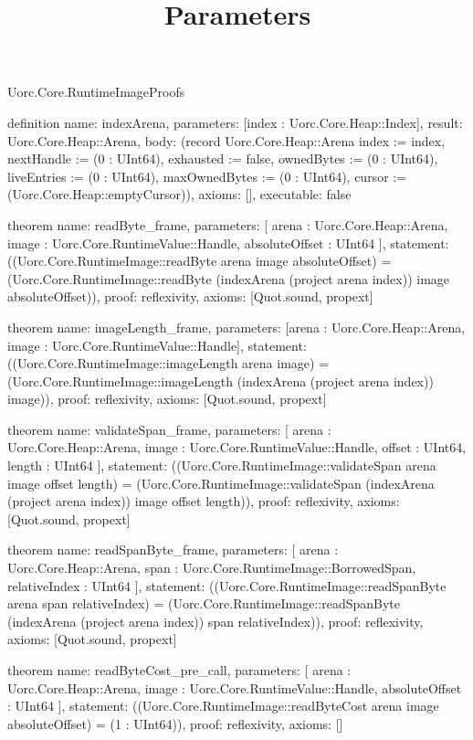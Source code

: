 \begin{lexlean}{Uorc.Core.RuntimeImageProofs}




\title{Parameters}

\begin{semanticmodule}
definition{
  name: indexArena,
  parameters: [index : Uorc.Core.Heap::Index],
  result: Uorc.Core.Heap::Arena,
  body: (record Uorc.Core.Heap::Arena {index := index, nextHandle := (0 : UInt64), exhausted := false, ownedBytes := (0 : UInt64), liveEntries := (0 : UInt64), maxOwnedBytes := (0 : UInt64), cursor := (Uorc.Core.Heap::emptyCursor)}),
  axioms: [],
  executable: false
}

theorem{
  name: readByte_frame,
  parameters: [
    arena : Uorc.Core.Heap::Arena,
    image : Uorc.Core.RuntimeValue::Handle,
    absoluteOffset : UInt64
  ],
  statement: ((Uorc.Core.RuntimeImage::readByte arena image absoluteOffset) = (Uorc.Core.RuntimeImage::readByte (indexArena (project arena index)) image absoluteOffset)),
  proof: reflexivity{},
  axioms: [Quot.sound, propext]
}

theorem{
  name: imageLength_frame,
  parameters: [arena : Uorc.Core.Heap::Arena, image : Uorc.Core.RuntimeValue::Handle],
  statement: ((Uorc.Core.RuntimeImage::imageLength arena image) = (Uorc.Core.RuntimeImage::imageLength (indexArena (project arena index)) image)),
  proof: reflexivity{},
  axioms: [Quot.sound, propext]
}

theorem{
  name: validateSpan_frame,
  parameters: [
    arena : Uorc.Core.Heap::Arena,
    image : Uorc.Core.RuntimeValue::Handle,
    offset : UInt64,
    length : UInt64
  ],
  statement: ((Uorc.Core.RuntimeImage::validateSpan arena image offset length) = (Uorc.Core.RuntimeImage::validateSpan (indexArena (project arena index)) image offset length)),
  proof: reflexivity{},
  axioms: [Quot.sound, propext]
}

theorem{
  name: readSpanByte_frame,
  parameters: [
    arena : Uorc.Core.Heap::Arena,
    span : Uorc.Core.RuntimeImage::BorrowedSpan,
    relativeIndex : UInt64
  ],
  statement: ((Uorc.Core.RuntimeImage::readSpanByte arena span relativeIndex) = (Uorc.Core.RuntimeImage::readSpanByte (indexArena (project arena index)) span relativeIndex)),
  proof: reflexivity{},
  axioms: [Quot.sound, propext]
}

theorem{
  name: readByteCost_pre_call,
  parameters: [
    arena : Uorc.Core.Heap::Arena,
    image : Uorc.Core.RuntimeValue::Handle,
    absoluteOffset : UInt64
  ],
  statement: ((Uorc.Core.RuntimeImage::readByteCost arena image absoluteOffset) = (1 : UInt64)),
  proof: reflexivity{},
  axioms: []
}


\end{semanticmodule}
\end{lexlean}
